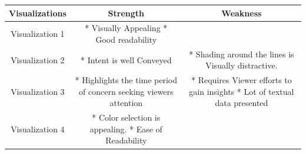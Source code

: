 \documentclass[]{book}
\begin{document}
\begin{longtable}[]{@{}ccc@{}}
\toprule
\begin{minipage}[b]{0.08\columnwidth}\centering
Visualizations\strut
\end{minipage} & \begin{minipage}[b]{0.35\columnwidth}\centering
Strength\strut
\end{minipage} & \begin{minipage}[b]{0.49\columnwidth}\centering
Weakness\strut
\end{minipage}\tabularnewline
\midrule
\endhead
\begin{minipage}[t]{0.08\columnwidth}\centering
Visualization 1\strut
\end{minipage} & \begin{minipage}[t]{0.35\columnwidth}\centering
* Visually Appealing * Good readability\strut
\end{minipage} & \begin{minipage}[t]{0.49\columnwidth}\centering
\strut
\end{minipage}\tabularnewline
\begin{minipage}[t]{0.08\columnwidth}\centering
Visualization 2\strut
\end{minipage} & \begin{minipage}[t]{0.35\columnwidth}\centering
* Intent is well Conveyed\strut
\end{minipage} & \begin{minipage}[t]{0.49\columnwidth}\centering
* Shading around the lines is Visually distractive.\strut
\end{minipage}\tabularnewline
\begin{minipage}[t]{0.08\columnwidth}\centering
Visualization 3\strut
\end{minipage} & \begin{minipage}[t]{0.35\columnwidth}\centering
* Highlights the time period of concern seeking viewers attention\strut
\end{minipage} & \begin{minipage}[t]{0.49\columnwidth}\centering
* Requires Viewer efforts to gain insights * Lot of textual data presented\strut
\end{minipage}\tabularnewline
\begin{minipage}[t]{0.08\columnwidth}\centering
Visualization 4\strut
\end{minipage} & \begin{minipage}[t]{0.35\columnwidth}\centering
* Color selection is appealing. * Ease of Readability\strut

\end{minipage}
\end{longtable}
\end{document}
